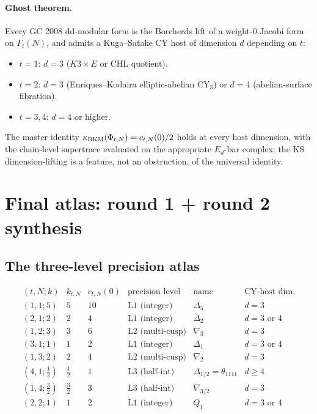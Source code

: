 \paragraph{Ghost theorem.} Every GC 2008 dd-modular form is the
Borcherds lift of a weight-$0$ Jacobi form on $\Gamma_t(N)$, and admits
a Kuga--Satake CY host of dimension $d$ depending on $t$:
\begin{itemize}
\item $t = 1$: $d = 3$ ($K3 \times E$ or CHL quotient).
\item $t = 2$: $d = 3$ (Enriques--Kodaira elliptic-abelian CY$_3$)
or $d = 4$ (abelian-surface fibration).
\item $t = 3, 4$: $d = 4$ or higher.
\end{itemize}
The master identity $\kappa_{\mathrm{BKM}}(\Phi_{t, N}) = c_{t, N}(0)/2$ holds at
every host dimension, with the chain-level supertrace evaluated on the
appropriate $E_d$-bar complex; the KS dimension-lifting is a feature,
not an obstruction, of the universal identity.

\section*{Final atlas: round 1 + round 2 synthesis}

\subsection*{The three-level precision atlas}

\[
\begin{array}{c|c|c|c|l|l}
 (t, N; k) & k_{t, N} & c_{t, N}(0) & \text{precision level} & \text{name} & \text{CY-host dim.} \\ \hline
 (1, 1; 5) & 5 & 10 & \text{L1 (integer)} & \Delta_5 & d = 3 \\
 (2, 1; 2) & 2 & 4 & \text{L1 (integer)} & \Delta_2 & d = 3 \text{ or } 4 \\
 (1, 2; 3) & 3 & 6 & \text{L2 (multi-cusp)} & \nabla_3 & d = 3 \\
 (3, 1; 1) & 1 & 2 & \text{L1 (integer)} & \Delta_1 & d = 3 \text{ or } 4 \\
 (1, 3; 2) & 2 & 4 & \text{L2 (multi-cusp)} & \nabla_2 & d = 3 \\
 (4, 1; \tfrac{1}{2}) & \tfrac{1}{2} & 1 & \text{L3 (half-int)} & \Delta_{1/2} = \theta_{1111} & d \geq 4 \\
 (1, 4; \tfrac{3}{2}) & \tfrac{3}{2} & 3 & \text{L3 (half-int)} & \nabla_{3/2} & d = 3 \\
 (2, 2; 1) & 1 & 2 & \text{L1 (integer)} & Q_1 & d = 3 \text{ or } 4 \\
\end{array}
\]

